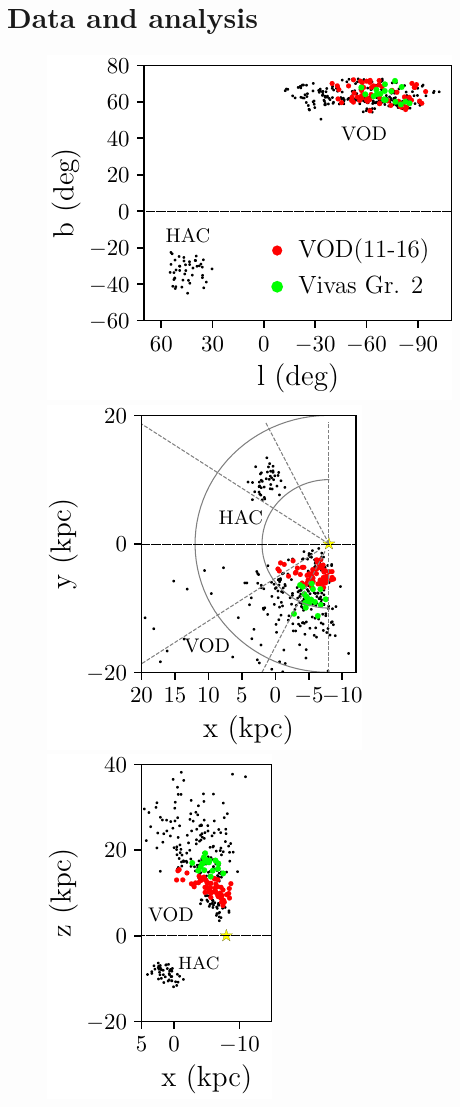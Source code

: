 \documentclass[a4paper,useAMS,usenatbib]{mnras}
\begin{document}
\section{Data and analysis}
%
\begin{figure}
	\includegraphics[scale=0.518]{lb.pdf}
	\includegraphics[scale=0.518]{xy.pdf}
	\includegraphics[scale=0.518]{xz.pdf}

\end{figure}
\end{document}
